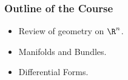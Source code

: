 {
  \begin{frame}
    \titlepage
  \end{frame}
}


\begin{frame}
  \frametitle{Outline of the Course}
  \begin{itemize}
  \item Review of geometry on $\R^n$.
  \item Manifolds and Bundles.
  \item Differential Forms.
  \end{itemize}
\end{frame}


